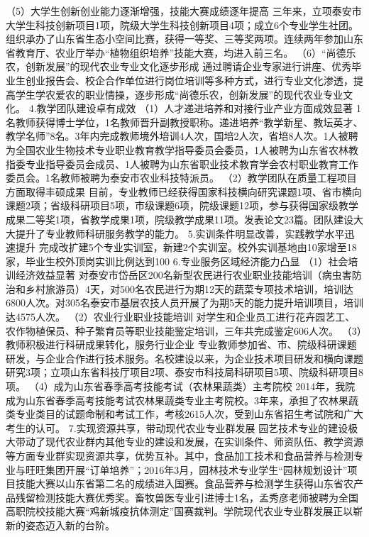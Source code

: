 （5）大学生创新创业能力逐渐增强，技能大赛成绩逐年提高
三年来，立项泰安市大学生科技创新项目1项，院级大学生科技创新项目4项；成立6个专业学生社团。组织承办了山东省生态小空间比赛，获得一等奖、三等奖两项。连续两年参加山东省教育厅、农业厅举办“植物组织培养”技能大赛，均进入前三名。
（6）“尚德乐农，创新发展”的现代农业专业文化逐步形成
通过聘请企业专家进行讲座、优秀毕业生创业报告会、校企合作单位进行岗位培训等多种方式，进行专业文化渗透，提高学生学农爱农的职业情操，逐步形成“尚德乐农，创新发展”的现代农业专业文化。
4.教学团队建设卓有成效
（1）人才递进培养和对接行业产业方面成效显著
1名教师获得博士学位，1名教师晋升副教授职称。递进培养“教学新星、教坛英才、教学名师”8名。3年内完成教师境外培训4人次，国培2人次，省培8人次。1人被聘为全国农业生物技术专业职业教育教学指导委员会委员，1人被聘为山东省农林教指委专业指导委员会成员、1人被聘为山东省职业技术教育学会农村职业教育工作委员会。1名教师被聘为泰安市农业科技特派员。
（2）教学团队在质量工程项目方面取得丰硕成果
目前，专业教师已经获得国家科技横向研究课题1项、省市横向课题2项；省级科研项目5项，市级课题6项，院级课题12项，参与获得国家级教学成果二等奖1项，省教学成果1项，院级教学成果11项。发表论文23篇。团队建设大大提升了专业教师科研服务教学的能力。
5.实训条件明显改善，实践教学水平迅速提升
完成改扩建5个专业实训室，新建2个实训室。校外实训基地由10家增至18家，毕业生校外顶岗实训比例达到100%
6.专业服务区域经济能力凸显
（1）社会培训经济效益显著
对泰安市岱岳区200名新型农民进行农业职业技能培训（病虫害防治和乡村旅游员）4天，对500名农民进行为期12天的蔬菜专项技术培训，培训达6800人次。对305名泰安市基层农技人员开展了为期5天的能力提升培训项目，培训达4575人次。
（2）农业行业职业技能培训
对学生和企业员工进行花卉园艺工、农作物植保员、种子繁育员等职业技能鉴定培训，三年共完成鉴定606人次。
（3）教师积极进行科研成果转化，服务行业企业
专业教师参加省、市、院级科研课题研发，与企业合作进行技术服务。名校建设以来，为企业技术项目研发和横向课题研究3项；立项山东省科技厅项目2项、泰安市科技局科研项目5项、院级科研项目8项。
（4）成为山东省春季高考技能考试（农林果蔬类）主考院校
2014年，我院成为山东省春季高考技能考试农林果蔬类专业主考院校。3年来，承担了农林果蔬类专业类目的试题命制和考试工作，考核2615人次，受到山东省招生考试院和广大考生的认可。
7.实现资源共享，带动现代农业专业群发展
园艺技术专业的建设极大带动了现代农业群内其他专业的建设和发展，在实训条件、师资队伍、教学资源等方面专业群实现资源共享，优势互补。其中，食品加工技术和食品营养与检测专业与旺旺集团开展“订单培养”；2016年3月，园林技术专业学生“园林规划设计”项目技能大赛以山东省第二名的成绩进入国赛。食品营养与检测学生获得山东省农产品残留检测技能大赛优秀奖。畜牧兽医专业引进博士1名，孟秀彦老师被聘为全国高职院校技能大赛“鸡新城疫抗体测定”国赛裁判。学院现代农业专业群发展正以崭新的姿态迈入新的台阶。
